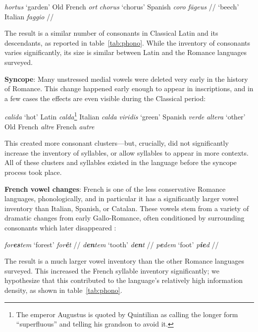 \documentclass[12pt,twoside]{article}
\newcommand{\ipa}[1]{/\textipa{#1}/}
\newcommand{\yields}{\textrightarrow}
\begin{document}
\begin{exe}
\ex \emph{hortus} `garden' \yields{} Old French \emph{ort}
\ex \emph{chorus} `chorus' \yields{} Spanish \emph{coro}
\ex \emph{f\=ageus} \ipa{fa:geus} `beech' \yields{} Italian \emph{faggio} \ipa{faddZo}
\end{exe}

The result is a similar number of consonants in Classical Latin and its descendants, as reported in table~\ref{tab:phono}. While the inventory of consonants varies significantly, its size is similar between Latin and the Romance languages surveyed.

\textbf{Syncope}: Many unstressed medial vowels were deleted very early in the history of Romance. This change happened early enough to appear in inscriptions, and in a few cases the effects are even visible during the Classical period:

\begin{exe}
\ex \emph{calida} `hot' \yields{} Latin \emph{calda}\footnote{The emperor Augustus is quoted by Quintilian \citep[I.6.19]{quintilian} as calling the longer form ``superfluous'' and telling his grandson to avoid it.} \yields{} Italian \emph{calda}
\ex \emph{viridis} `green' \yields{} Spanish \emph{verde}
\ex \emph{altera} `other' \yields{} Old French \emph{altre} \yields{} French \emph{autre}
\end{exe}

This created more consonant clusters---but, crucially, did not significantly increase the inventory of syllables, or allow syllables to appear in more contexts. All of these clusters and syllables existed in the language before the syncope process took place.

\textbf{French vowel changes}: French is one of the less conservative Romance languages, phonologically, and in particular it has a significantly larger vowel inventory than Italian, Spanish, or Catalan. These vowels stem from a variety of dramatic changes from early Gallo-Romance, often conditioned by surrounding consonants which later disappeared \citep{pope,boyd}:

\begin{exe}
\ex \emph{for\textbf{es}tem} `forest' \yields{} \emph{for\textbf{\^e}t} \ipa{fOKE}
\ex \emph{d\textbf{en}tem} `tooth' \yields{} \emph{d\textbf{en}t} \ipa{d\~A}
\ex \emph{p\textbf{e}dem} `foot' \yields{} \emph{p\textbf{ie}d} \ipa{pje}
\end{exe}

The result is a much larger vowel inventory than the other Romance languages surveyed. This increased the French syllable inventory significantly; we hypothesize that this contributed to the language's relatively high information density, as shown in table~\ref{tab:phono}.
\end{document}
